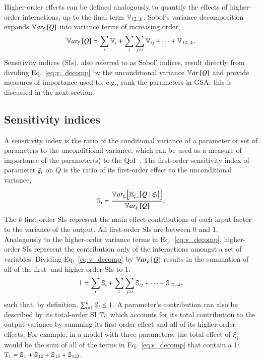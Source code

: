 Higher-order effects can be defined analogously to quantify the effects of higher-order interactions, up to the final term $\V{12 \ldots k}$.
Sobol's variance decomposition expands $\Vxi{Q}$ into variance terms of increasing order,
\begin{equation} \label{eq:v_decomp}
    \Vxi{Q} = \sum_i \V{i} + \sum_i \sum_{j > i} \V{ij} + \cdots + \V{12 \ldots k} .
\end{equation}
Sensitivity indices (SIs), also referred to as Sobol' indices, result directly from dividing Eq.~\eqref{eq:v_decomp} by the unconditional variance $\Var{Q}$ and provide measures of importance used to, e.g., rank the parameters in GSA; this is discussed in the next section.

\subsection{Sensitivity indices}
A sensitivity index is the ratio of the conditional variance of a parameter or set of parameters to the unconditional variance, which can be used as a measure of importance of the parameter(s) to the QoI~\cite{sobol-1993, homma-saltelli-1996, hora-iman-1986, ishigami-homma-1990, iman-hora-1990}.
The first-order sensitivity index of parameter $\xii$ on $Q$ is the ratio of its first-order effect to the unconditional variance,
\begin{equation} \label{eq:si}
    \S{i} = \frac{\VEi{Q \mid \xii}}{\Vxi{Q}} .
\end{equation}
The $k$ first-order SIs represent the main effect contributions of each input factor to the variance of the output.
All first-order SIs are between 0 and 1.
Analogously to the higher-order variance terms in Eq.~\eqref{eq:v_decomp}, higher-order SIs represent the contribution only of the interactions amongst a set of variables. 
Dividing Eq.~\eqref{eq:v_decomp} by $\Vxi{Q}$ results in the summation of all of the first- and higher-order SIs to 1:
\begin{equation} \label{eq:s_decomp}
    1 = \sum_i \S{i} + \sum_i \sum_{j > i} \S{ij} + \cdots + \S{12 \ldots k},
\end{equation}
such that, by definition, $\sum_{i=1}^k \S{i} \leq 1$. 
A parameter's contribution can also be described by its total-order SI $\T{i}$, which accounts for its total contribution to the output variance by summing its first-order effect and all of its higher-order effects.
For example, in a model with three parameters, the total effect of $\xi_1$ would be the sum of all of the terms in Eq.~\eqref{eq:s_decomp} that contain a 1: $\T{1} = \S{1} + \S{12} + \S{13} + \S{123}$. 

